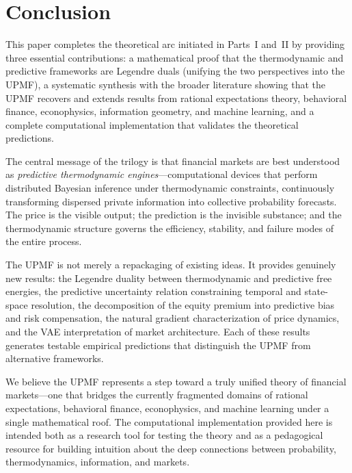 \documentclass[12pt,a4paper]{article}
\theoremstyle{definition}
\begin{document}

\section{Conclusion}\label{sec:conclusion}

This paper completes the theoretical arc initiated in Parts~I and~II by providing three essential contributions: a mathematical proof that the thermodynamic and predictive frameworks are Legendre duals (unifying the two perspectives into the UPMF), a systematic synthesis with the broader literature showing that the UPMF recovers and extends results from rational expectations theory, behavioral finance, econophysics, information geometry, and machine learning, and a complete computational implementation that validates the theoretical predictions.

The central message of the trilogy is that financial markets are best understood as \emph{predictive thermodynamic engines}---computational devices that perform distributed Bayesian inference under thermodynamic constraints, continuously transforming dispersed private information into collective probability forecasts. The price is the visible output; the prediction is the invisible substance; and the thermodynamic structure governs the efficiency, stability, and failure modes of the entire process.

The UPMF is not merely a repackaging of existing ideas. It provides genuinely new results: the Legendre duality between thermodynamic and predictive free energies, the predictive uncertainty relation constraining temporal and state-space resolution, the decomposition of the equity premium into predictive bias and risk compensation, the natural gradient characterization of price dynamics, and the VAE interpretation of market architecture. Each of these results generates testable empirical predictions that distinguish the UPMF from alternative frameworks.

We believe the UPMF represents a step toward a truly unified theory of financial markets---one that bridges the currently fragmented domains of rational expectations, behavioral finance, econophysics, and machine learning under a single mathematical roof. The computational implementation provided here is intended both as a research tool for testing the theory and as a pedagogical resource for building intuition about the deep connections between probability, thermodynamics, information, and markets.
\end{document}
